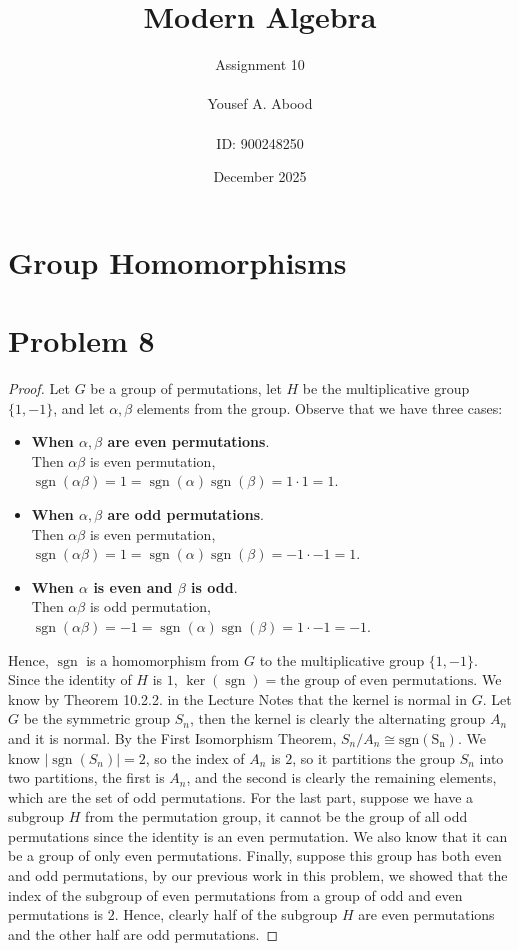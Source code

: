 \documentclass[a4paper,12pt]{article}
\title{Modern Algebra}
\author{Assignment 10\\ \\ Yousef A. Abood\\ \\ ID: 900248250}
\date{December 2025}
\begin{document}
\maketitle
\noindent\makebox[\linewidth]{\rule{15cm}{0.4pt}}
\section{Group Homomorphisms}
\section*{Problem 8}
\begin{proof}
    Let $G$ be a group of permutations, let $H$ be the multiplicative group $\{1,-1\}$, and let $\alpha,\beta$ elements from the group. Observe that we have three cases:
    \begin{itemize}
        \item \textbf{When $\alpha,\beta$ are even permutations}. \\Then $\alpha\beta$ is even permutation, $\operatorname{sgn}(\alpha\beta)=1=\operatorname{sgn}(\alpha)\operatorname{sgn}(\beta)=1\cdot 1=1.$
        \item \textbf{When $\alpha,\beta$ are odd permutations}.\\ Then $\alpha\beta$ is even permutation, $\operatorname{sgn}(\alpha\beta)=1=\operatorname{sgn}(\alpha)\operatorname{sgn}(\beta)=-1\cdot -1=1.$
        \item \textbf{When $\alpha$ is even and $\beta$ is odd}.\\ Then $\alpha\beta$ is odd permutation, $\operatorname{sgn}(\alpha\beta)=-1=\operatorname{sgn}(\alpha)\operatorname{sgn}(\beta)=1\cdot -1=-1.$
    \end{itemize} 
    Hence, $\operatorname{sgn}$ is a homomorphism from $G$ to the multiplicative group $\{1,-1\}.$
    Since the identity of $H$ is $1$, $\operatorname{ker}(\operatorname{sgn})=\text{the group of even permutations}$. We know by Theorem 10.2.2. in the Lecture Notes that the kernel is normal in $G.$ Let $G$ be the symmetric group $S_n$, then the kernel is clearly the alternating group $A_n$ and it is normal. 
    By the First Isomorphism Theorem, $S_n/A_n \cong \operatorname{sgn(S_n)}.$ We know $|\operatorname{sgn}(S_n)|=2$, so the index of $A_n$ is $2$, so it partitions the group $S_n$ into two partitions, the first is $A_n$, and the second is clearly the remaining elements, which are the set of odd permutations. 
    For the last part, suppose we have a subgroup $H$ from the permutation group, it cannot be the group of all odd permutations since the identity is an even permutation. We also know that it can be a group of only even permutations. Finally, suppose this group has both even and odd permutations, by our previous work in this problem, we showed that the index of the subgroup of even permutations from a group of odd and even permutations is $2$. Hence, clearly half of the subgroup $H$ are even permutations and the other half are odd permutations. 
\end{proof}
\end{document}
